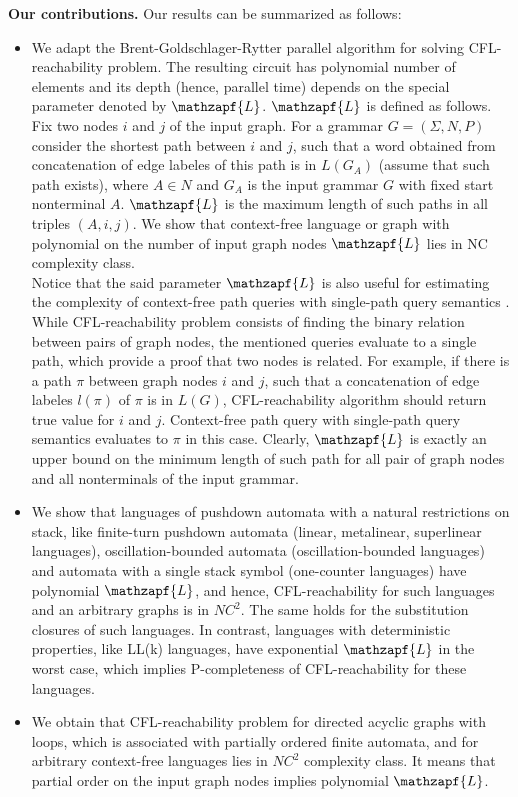 \documentclass[smallextended]{svjour3}       %
\begin{document}
\textbf{Our contributions.} Our results can be summarized as follows:
\begin{itemize}
\item We adapt the Brent-Goldschlager-Rytter parallel algorithm for solving CFL-reachability problem. The resulting circuit has polynomial number of elements and its depth (hence, parallel time) depends on the special parameter denoted by $\mathzapf{L}$. $\mathzapf{L}$ is defined as follows. Fix two nodes $i$ and $j$ of the input graph. For a grammar $G = (\Sigma, N, P)$ consider the shortest path between $i$ and $j$, such that a word obtained from concatenation of edge labeles of this path is in $L(G_A)$ (assume that such path exists), where $A \in N$ and $G_A$ is the input grammar $G$ with fixed start nonterminal $A$. $\mathzapf{L}$ is the maximum length of such paths in all triples $(A, i, j)$. We show that context-free language or graph with polynomial on the number of input graph nodes $\mathzapf{L}$ lies in NC complexity class. 
\\
Notice that the said parameter $\mathzapf{L}$ is also useful for estimating the complexity of context-free path queries with single-path query semantics \cite{HellingsCFPQ}. While CFL-reachability problem consists of finding the binary relation between pairs of graph nodes, the mentioned queries evaluate to a single path, which provide a proof that two nodes is related. For example, if there is a path $\pi$ between graph nodes $i$ and $j$, such that a concatenation of edge labeles $l(\pi)$ of $\pi$ is in $L(G)$, CFL-reachability algorithm should return true value for $i$ and $j$. Context-free path query with single-path query semantics evaluates to $\pi$ in this case. Clearly, $\mathzapf{L}$ is exactly an upper bound on the minimum length of such path for all pair of graph nodes and all nonterminals of the input grammar.
\item We show that languages of pushdown automata with a natural restrictions on stack, like finite-turn pushdown automata (linear, metalinear, superlinear languages), oscillation-bounded automata (oscillation-bounded languages) and automata with a single stack symbol (one-counter languages) have polynomial $\mathzapf{L}$, and hence, CFL-reachability for such languages and an arbitrary graphs is in $NC^2$. The same holds for the substitution closures of such languages. In contrast, languages with deterministic properties, like LL(k) languages, have exponential $\mathzapf{L}$ in the worst case, which implies P-completeness of CFL-reachability for these languages.
\item We obtain that CFL-reachability problem for directed acyclic graphs with loops, which is associated with partially ordered finite automata, and for arbitrary context-free languages lies in $NC^2$ complexity class. It means that partial order on the input graph nodes implies polynomial $\mathzapf{L}$.
\end{itemize}
\end{document}
